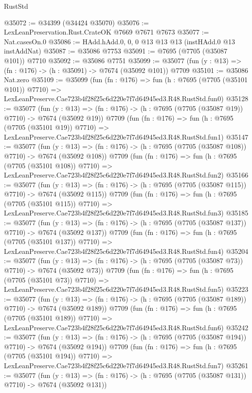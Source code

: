 \begin{lexlean}{RustStd}
\begin{coremodule}
@35072 := @34399 (@34424 @35070)
@35076 := LexLeanPreservation.Rust.CrateOK @7669 @7671 @7673
@35077 := Nat.casesOn.{0}
@35086 := HAdd.hAdd.{0, 0, 0} @13 @13 @13 (instHAdd.{0} @13 instAddNat)
@35087 := @35086 @7753
@35091 := @7695 (@7705 (@35087 @101)) @7710
@35092 := @35086 @7751
@35099 := @35077 (fun (y : @13) => (fn : @176) -> (h : @35091) -> @7674 (@35092 @101)) @7709
@35101 := @35086 Nat.zero
@35109 := @35099
    (fun (fn : @176) =>
    fun (h : @7695 (@7705 (@35101 @101)) @7710) =>
    LexLeanPreserve.Cae723b4f28f25c6d220e7f7d64945ed3.R48.RustStd.fun0)
@35128 := @35077
    (fun (y : @13) => (fn : @176) -> (h : @7695 (@7705 (@35087 @19)) @7710) -> @7674 (@35092 @19))
    @7709
    (fun (fn : @176) =>
    fun (h : @7695 (@7705 (@35101 @19)) @7710) =>
    LexLeanPreserve.Cae723b4f28f25c6d220e7f7d64945ed3.R48.RustStd.fun1)
@35147 := @35077
    (fun (y : @13) => (fn : @176) -> (h : @7695 (@7705 (@35087 @108)) @7710) -> @7674 (@35092 @108))
    @7709
    (fun (fn : @176) =>
    fun (h : @7695 (@7705 (@35101 @108)) @7710) =>
    LexLeanPreserve.Cae723b4f28f25c6d220e7f7d64945ed3.R48.RustStd.fun2)
@35166 := @35077
    (fun (y : @13) => (fn : @176) -> (h : @7695 (@7705 (@35087 @115)) @7710) -> @7674 (@35092 @115))
    @7709
    (fun (fn : @176) =>
    fun (h : @7695 (@7705 (@35101 @115)) @7710) =>
    LexLeanPreserve.Cae723b4f28f25c6d220e7f7d64945ed3.R48.RustStd.fun3)
@35185 := @35077
    (fun (y : @13) => (fn : @176) -> (h : @7695 (@7705 (@35087 @137)) @7710) -> @7674 (@35092 @137))
    @7709
    (fun (fn : @176) =>
    fun (h : @7695 (@7705 (@35101 @137)) @7710) =>
    LexLeanPreserve.Cae723b4f28f25c6d220e7f7d64945ed3.R48.RustStd.fun4)
@35204 := @35077
    (fun (y : @13) => (fn : @176) -> (h : @7695 (@7705 (@35087 @73)) @7710) -> @7674 (@35092 @73))
    @7709
    (fun (fn : @176) =>
    fun (h : @7695 (@7705 (@35101 @73)) @7710) =>
    LexLeanPreserve.Cae723b4f28f25c6d220e7f7d64945ed3.R48.RustStd.fun5)
@35223 := @35077
    (fun (y : @13) => (fn : @176) -> (h : @7695 (@7705 (@35087 @189)) @7710) -> @7674 (@35092 @189))
    @7709
    (fun (fn : @176) =>
    fun (h : @7695 (@7705 (@35101 @189)) @7710) =>
    LexLeanPreserve.Cae723b4f28f25c6d220e7f7d64945ed3.R48.RustStd.fun6)
@35242 := @35077
    (fun (y : @13) => (fn : @176) -> (h : @7695 (@7705 (@35087 @194)) @7710) -> @7674 (@35092 @194))
    @7709
    (fun (fn : @176) =>
    fun (h : @7695 (@7705 (@35101 @194)) @7710) =>
    LexLeanPreserve.Cae723b4f28f25c6d220e7f7d64945ed3.R48.RustStd.fun7)
@35261 := @35077
    (fun (y : @13) => (fn : @176) -> (h : @7695 (@7705 (@35087 @131)) @7710) -> @7674 (@35092 @131))

\end{coremodule}
\end{lexlean}
